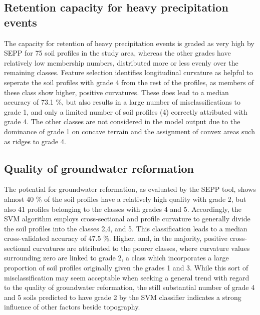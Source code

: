 \documentclass[soilsystems,article,submit,moreauthors,pdftex,10pt,a4paper]{Definitions/mdpi}
\begin{document}
\subsection{Retention capacity for heavy precipitation events}
The capacity for retention of heavy precipitation events is graded as very high by SEPP for 75 soil profiles in the study area, whereas the other grades have relatively low membership numbers, distributed more or less evenly over the remaining classes. Feature selection identifies longitudinal curvature as helpful to seperate the soil profiles with grade 4 from the rest of the profiles, as members of these class show higher, positive curvatures. These does lead to a median accuracy of 73.1 \%, but also results in a large number of misclassifications to grade 1, and only a limited number of soil profiles (4) correctly attributed with grade 4. The other classes are not considered in the model output due to the dominance of grade 1 on concave terrain and the assignment of convex areas such as ridges to grade 4.
\subsection{Quality of groundwater reformation}
The potential for groundwater reformation, as evaluated by the SEPP tool, shows almost 40 \% of the soil profiles have a relatively high quality with grade 2, but also 41 profiles belonging to the classes with grades 4 and 5. Accordingly, the SVM algorithm employs cross-sectional and profile curvature to generally divide the soil profiles into the classes 2,4, and 5. This classification leads to a median cross-validated accuracy of 47.5 \%. Higher, and, in the majority, positive cross-sectional curvatures are attributed to the poorer classes, where curvature values surrounding zero are linked to grade 2, a class which incorporates a large proportion of soil profiles originally given the grades 1 and 3. While this sort of misclassification may seem acceptable when seeking a general trend with regard to the quality of groundwater reformation, the still substantial number of grade 4 and 5 soils predicted to have grade 2 by the SVM classifier indicates a strong influence of other factors beside topography.
\end{document}
